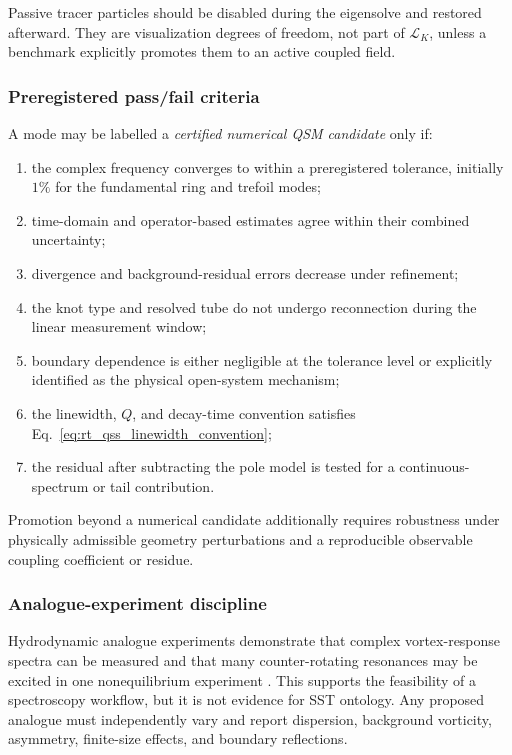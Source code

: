         Passive tracer particles should be disabled during the eigensolve and restored
        afterward.  They are visualization degrees of freedom, not part of
        \(\mathcal L_K\), unless a benchmark explicitly promotes them to an active
        coupled field.

    \subsubsection*{Preregistered pass/fail criteria}

        A mode may be labelled a \emph{certified numerical QSM candidate} only if:
        \begin{enumerate}
            \item the complex frequency converges to within a preregistered tolerance,
            initially \(1\%\) for the fundamental ring and trefoil modes;
            \item time-domain and operator-based estimates agree within their combined
            uncertainty;
            \item divergence and background-residual errors decrease under refinement;
            \item the knot type and resolved tube do not undergo reconnection during
            the linear measurement window;
            \item boundary dependence is either negligible at the tolerance level or
            explicitly identified as the physical open-system mechanism;
            \item the linewidth, \(Q\), and decay-time convention satisfies
            Eq.~\eqref{eq:rt_qss_linewidth_convention};
            \item the residual after subtracting the pole model is tested for a
            continuous-spectrum or tail contribution.
        \end{enumerate}

        Promotion beyond a numerical candidate additionally requires robustness under
        physically admissible geometry perturbations and a reproducible observable
        coupling coefficient or residue.

    \subsubsection*{Analogue-experiment discipline}

        Hydrodynamic analogue experiments demonstrate that complex vortex-response
        spectra can be measured and that many counter-rotating resonances may be
        excited in one nonequilibrium experiment
        \cite{TorresPatrickRichartzWeinfurtner2020,
        BertiEtAl2026BlackHoleSpectroscopy}.  This supports the feasibility of a
        spectroscopy workflow, but it is not evidence for SST ontology.  Any proposed
        analogue must independently vary and report dispersion, background vorticity,
        asymmetry, finite-size effects, and boundary reflections.

